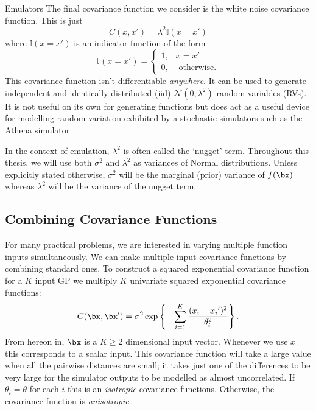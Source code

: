 \begin{chapter}{Emulators \label{Ch:Emulators}}
The final covariance function we consider is the white noise covariance function. This is just
\begin{equation}
  C(x, x') = \lambda^2 \mathbb{I}(x = x')
\end{equation}
where $\mathbb{I}(x = x')$ is an indicator function of the form
\begin{equation}
  \mathbb{I}(x = x') = \begin{cases}
    1, & x = x'\\
    0, & \text{ otherwise.}
  \end{cases}
\end{equation}
This covariance function isn't differentiable \textit{anywhere}. It can be used to generate independent and identically distributed (iid) $\mathcal{N}(0, \lambda^2)$ random variables (RVs). It is not useful on its own for generating functions but does act as a useful device for modelling random variation exhibited by a stochastic simulators such as the Athena simulator

In the context of emulation, $\lambda^2$ is often called the `nugget' term. Throughout this thesis, we will use both $\sigma^2$ and $\lambda^2$ as variances of Normal distributions. Unless explicitly stated otherwise, $\sigma^2$ will be the marginal (prior) variance of $f(\bx)$ whereas $\lambda^2$ will be the variance of the nugget term.

\subsection{Combining Covariance Functions}

For many practical problems, we are interested in varying multiple function inputs simultaneously. We can make multiple input covariance functions by combining standard ones. To construct a squared exponential covariance function for a $K$ input GP we multiply $K$ univariate squared exponential covariance functions:
\begin{equation}
C(\bx, \bx') = \sigma^2 \exp\left\{ - \sum_{i = 1}^K \frac{(x_i - {x_i}')^2}{\theta_i^2}\right\}.
\end{equation}
From hereon in, $\bx$ is a $K \geq 2$ dimensional input vector. Whenever we use $x$ this corresponds to a scalar input. This covariance function will take a large value when all the pairwise distances are small; it takes just one of the differences to be very large for the simulator outputs to be modelled as almost uncorrelated. If $\theta_i = \theta$ for each $i$ this is an \textit{isotropic} covariance functions. Otherwise, the covariance function is \textit{anisotropic}.


\end{chapter}
